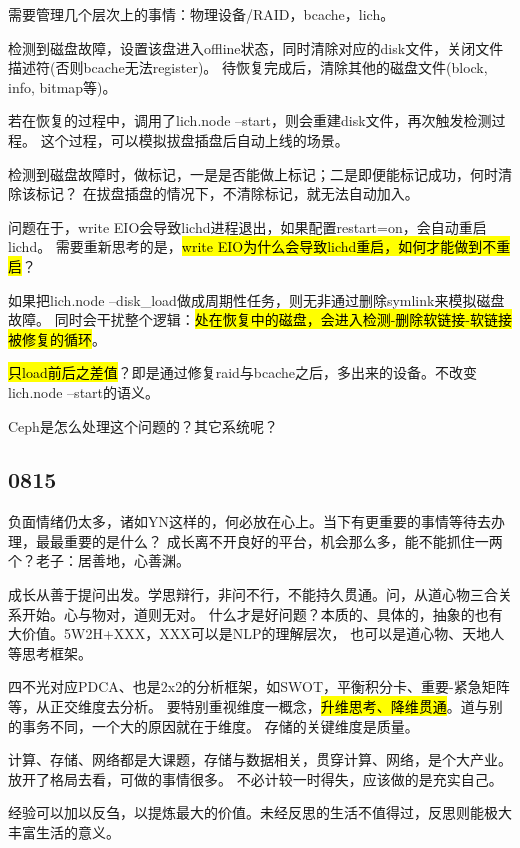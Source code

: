 需要管理几个层次上的事情：物理设备/RAID，bcache，lich。

检测到磁盘故障，设置该盘进入offline状态，同时清除对应的disk文件，关闭文件描述符(否则bcache无法register)。
待恢复完成后，清除其他的磁盘文件(block, info, bitmap等)。

若在恢复的过程中，调用了lich.node --start，则会重建disk文件，再次触发检测过程。
这个过程，可以模拟拔盘插盘后自动上线的场景。

检测到磁盘故障时，做标记，一是是否能做上标记；二是即便能标记成功，何时清除该标记？
在拔盘插盘的情况下，不清除标记，就无法自动加入。

问题在于，write EIO会导致lichd进程退出，如果配置restart=on，会自动重启lichd。
需要重新思考的是，\hl{write EIO为什么会导致lichd重启，如何才能做到不重启}？

如果把lich.node --disk\_load做成周期性任务，则无非通过删除symlink来模拟磁盘故障。
同时会干扰整个逻辑：\hl{处在恢复中的磁盘，会进入检测-删除软链接-软链接被修复的循环}。

\hl{只load前后之差值}？即是通过修复raid与bcache之后，多出来的设备。不改变lich.node --start的语义。

\begin{enumbox}
\item Ceph是怎么处理这个问题的？其它系统呢？
\end{enumbox}

\subsection{0815}

负面情绪仍太多，诸如YN这样的，何必放在心上。当下有更重要的事情等待去办理，最最重要的是什么？
成长离不开良好的平台，机会那么多，能不能抓住一两个？老子：居善地，心善渊。

成长从善于提问出发。学思辩行，非问不行，不能持久贯通。问，从道心物三合关系开始。心与物对，道则无对。
什么才是好问题？本质的、具体的，抽象的也有大价值。5W2H+XXX，XXX可以是NLP的理解层次，
也可以是道心物、天地人等思考框架。

四不光对应PDCA、也是2x2的分析框架，如SWOT，平衡积分卡、重要-紧急矩阵等，从正交维度去分析。
要特别重视维度一概念，\hl{升维思考、降维贯通}。道与别的事务不同，一个大的原因就在于维度。
存储的关键维度是质量。

计算、存储、网络都是大课题，存储与数据相关，贯穿计算、网络，是个大产业。放开了格局去看，可做的事情很多。
不必计较一时得失，应该做的是充实自己。

经验可以加以反刍，以提炼最大的价值。未经反思的生活不值得过，反思则能极大丰富生活的意义。


